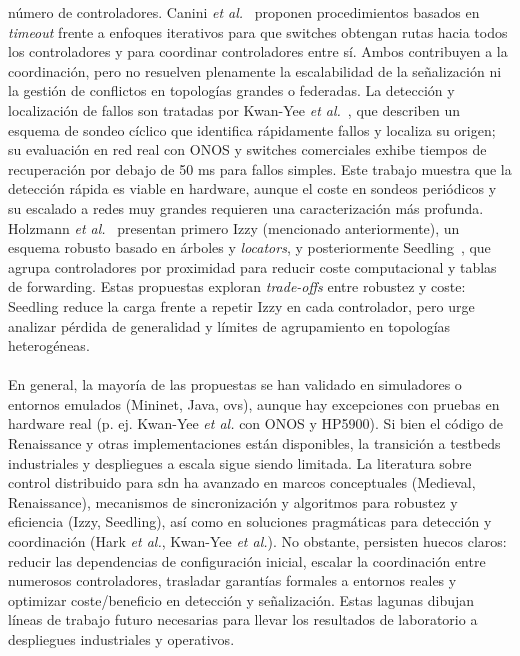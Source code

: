 número de controladores. Canini \textit{et al.}~\cite{Canini17} proponen procedimientos basados en \textit{timeout} frente a enfoques iterativos para que switches obtengan rutas hacia todos los controladores y para coordinar controladores entre sí. Ambos contribuyen a la coordinación, pero no resuelven plenamente la escalabilidad de la señalización ni la gestión de conflictos en topologías grandes o federadas. La detección y localización de fallos son tratadas por Kwan-Yee \textit{et al.}~\cite{Kwan-Yee18}, que describen un esquema de sondeo cíclico que identifica rápidamente fallos y localiza su origen; su evaluación en red real con ONOS y switches comerciales exhibe tiempos de recuperación por debajo de 50 ms para fallos simples. Este trabajo muestra que la detección rápida es viable en hardware, aunque el coste en sondeos periódicos y su escalado a redes muy grandes requieren una caracterización más profunda. Holzmann \textit{et al.}~\cite{Holzmann19} presentan primero Izzy (mencionado anteriormente), un esquema robusto basado en árboles y \textit{locators}, y posteriormente Seedling~\cite{Holzmann18}, que agrupa controladores por proximidad para reducir coste computacional y tablas de forwarding. Estas propuestas exploran \textit{trade-offs} entre robustez y coste: Seedling reduce la carga frente a repetir Izzy en cada controlador, pero urge analizar pérdida de generalidad y límites de agrupamiento en topologías heterogéneas.\\
\\
En general, la mayoría de las propuestas se han validado en simuladores o entornos emulados (Mininet, Java, \gls{ovs}), aunque hay excepciones con pruebas en hardware real (p. ej. Kwan-Yee \textit{et al.} con ONOS y HP5900). Si bien el código de Renaissance y otras implementaciones están disponibles, la transición a testbeds industriales y despliegues a escala sigue siendo limitada. La literatura sobre control distribuido para \gls{sdn} ha avanzado en marcos conceptuales (Medieval, Renaissance), mecanismos de sincronización y algoritmos para robustez y eficiencia (Izzy, Seedling), así como en soluciones pragmáticas para detección y coordinación (Hark \textit{et al.}, Kwan-Yee \textit{et al.}). No obstante, persisten huecos claros: reducir las dependencias de configuración inicial, escalar la coordinación entre numerosos controladores, trasladar garantías formales a entornos reales y optimizar coste/beneficio en detección y señalización. Estas lagunas dibujan líneas de trabajo futuro necesarias para llevar los resultados de laboratorio a despliegues industriales y operativos.

